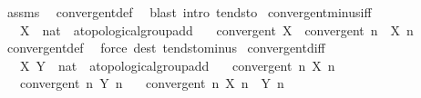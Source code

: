 \begin{isabellebody}
%
\isatagproof
{}\isamarkupfalse%
\ assms\ \isamarkupfalse%
\ convergent{\isacharunderscore}{\kern0pt}def\ \isamarkupfalse%
\ {\isacharparenleft}{\kern0pt}blast\ intro{\isacharcolon}{\kern0pt}\ tendsto{\isacharparenright}{\kern0pt}%
\endisatagproof
{\isafoldproof}%
%
\isadelimproof
\isanewline
%
\endisadelimproof
\isanewline
{}\isamarkupfalse%
\ convergent{\isacharunderscore}{\kern0pt}minus{\isacharunderscore}{\kern0pt}iff{\isacharcolon}{\kern0pt}\isanewline
\ \ \ X\ {\isacharcolon}{\kern0pt}{\isacharcolon}{\kern0pt}\ {\isachardoublequoteopen}nat\ {\isasymRightarrow}\ {\isacharprime}{\kern0pt}a{\isacharcolon}{\kern0pt}{\isacharcolon}{\kern0pt}topological{\isacharunderscore}{\kern0pt}group{\isacharunderscore}{\kern0pt}add{\isachardoublequoteclose}\isanewline
\ \ \ {\isachardoublequoteopen}convergent\ X\ {\isasymlongleftrightarrow}\ convergent\ {\isacharparenleft}{\kern0pt}{\isasymlambda}n{\isachardot}{\kern0pt}\ {\isacharminus}{\kern0pt}\ X\ n{\isacharparenright}{\kern0pt}{\isachardoublequoteclose}\isanewline
%
\isadelimproof
\ \ %
\endisadelimproof
%
\isatagproof
{}\isamarkupfalse%
\ convergent{\isacharunderscore}{\kern0pt}def\ \isamarkupfalse%
\ {\isacharparenleft}{\kern0pt}force\ dest{\isacharcolon}{\kern0pt}\ tendsto{\isacharunderscore}{\kern0pt}minus{\isacharparenright}{\kern0pt}%
\endisatagproof
{\isafoldproof}%
%
\isadelimproof
\isanewline
%
\endisadelimproof
\isanewline
{}\isamarkupfalse%
\ convergent{\isacharunderscore}{\kern0pt}diff{\isacharcolon}{\kern0pt}\isanewline
\ \ \ X\ Y\ {\isacharcolon}{\kern0pt}{\isacharcolon}{\kern0pt}\ {\isachardoublequoteopen}nat\ {\isasymRightarrow}\ {\isacharprime}{\kern0pt}a{\isacharcolon}{\kern0pt}{\isacharcolon}{\kern0pt}topological{\isacharunderscore}{\kern0pt}group{\isacharunderscore}{\kern0pt}add{\isachardoublequoteclose}\isanewline
\ \ \ {\isachardoublequoteopen}convergent\ {\isacharparenleft}{\kern0pt}{\isasymlambda}n{\isachardot}{\kern0pt}\ X\ n{\isacharparenright}{\kern0pt}{\isachardoublequoteclose}\isanewline
\ \ \ {\isachardoublequoteopen}convergent\ {\isacharparenleft}{\kern0pt}{\isasymlambda}n{\isachardot}{\kern0pt}\ Y\ n{\isacharparenright}{\kern0pt}{\isachardoublequoteclose}\isanewline
\ \ \ {\isachardoublequoteopen}convergent\ {\isacharparenleft}{\kern0pt}{\isasymlambda}n{\isachardot}{\kern0pt}\ X\ n\ {\isacharminus}{\kern0pt}\ Y\ n{\isacharparenright}{\kern0pt}{\isachardoublequoteclose}\isanewline

\end{isabellebody}
